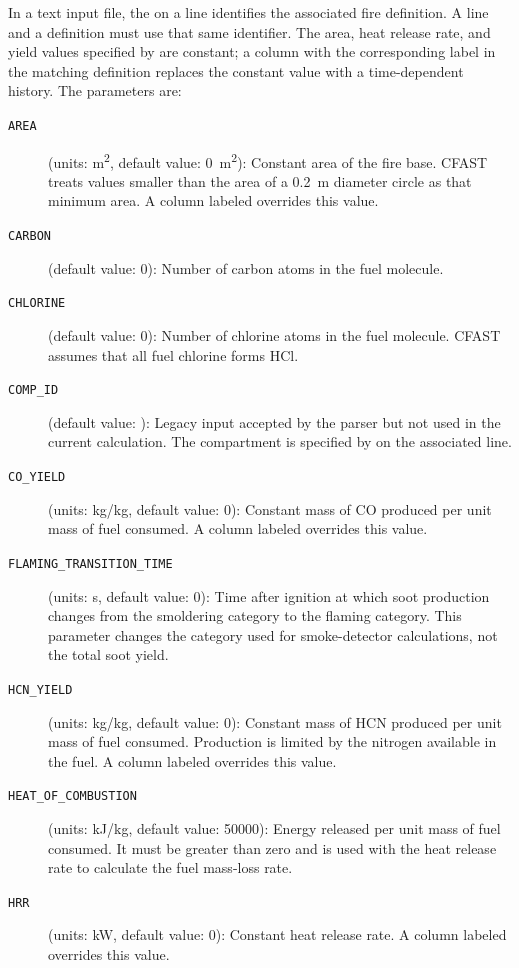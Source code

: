 {{In a text input file, the  on a  line identifies the associated fire definition. A  line and a  definition must use that same identifier. The area, heat release rate, and yield values specified by  are constant; a column with the corresponding label in the matching  definition replaces the constant value with a time-dependent history. The  parameters are:
\begin{description}
\item[\texttt{AREA}] (units: \unit{m^2}, default value: 0~\unit{m^2}): Constant area of the fire base. CFAST treats values smaller than the area of a 0.2~m diameter circle as that minimum area. A  column labeled  overrides this value.
\item[\texttt{CARBON}] (default value: 0): Number of carbon atoms in the fuel molecule.
\item[\texttt{CHLORINE}] (default value: 0): Number of chlorine atoms in the fuel molecule. CFAST assumes that all fuel chlorine forms HCl.
\item[\texttt{COMP\_ID}] (default value: ): Legacy input accepted by the parser but not used in the current calculation. The compartment is specified by  on the associated  line.
\item[\texttt{CO\_YIELD}] (units: kg/kg, default value: 0): Constant mass of CO produced per unit mass of fuel consumed. A  column labeled  overrides this value.
\item[\texttt{FLAMING\_TRANSITION\_TIME}] (units: s, default value: 0): Time after ignition at which soot production changes from the smoldering category to the flaming category. This parameter changes the category used for smoke-detector calculations, not the total soot yield.
\item[\texttt{HCN\_YIELD}] (units: kg/kg, default value: 0): Constant mass of HCN produced per unit mass of fuel consumed. Production is limited by the nitrogen available in the fuel. A  column labeled  overrides this value.
\item[\texttt{HEAT\_OF\_COMBUSTION}] (units: kJ/kg, default value: 50000): Energy released per unit mass of fuel consumed. It must be greater than zero and is used with the heat release rate to calculate the fuel mass-loss rate.
\item[\texttt{HRR}] (units: kW, default value: 0): Constant heat release rate. A  column labeled  overrides this value.

\end{description}}}
